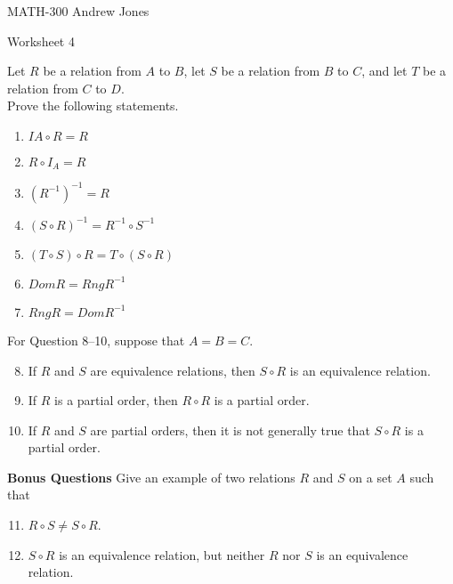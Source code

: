 \documentclass{article}
\begin{document}
    MATH-300 \hfill Andrew Jones
  \begin{center}
  {\huge Worksheet 4}
  \end{center}
  Let $R$ be a relation from $A$ to $B$, let $S$ be a relation from $B$ to $C$, and let $T$ be a relation from $C$ to $D$. \\ Prove the following statements. \\
  \begin{enumerate}
    \item $IA \circ R = R$
    \item $R \circ I_A = R$
    \item $(R^{-1})^{-1} = R$
    \item $(S \circ R)^{-1} = R^{-1}\circ S^{-1}$
    \item $(T \circ S) \circ R = T \circ (S \circ R)$
    \item $Dom R = Rng R^{-1}$
    \item $Rng R = Dom R^{-1}$
  \end{enumerate}
  For Question 8–10, suppose that $A = B = C$.
  \begin{enumerate} \setcounter{enumi}{7}
    \item If $R$ and $S$ are equivalence relations, then $S \circ R$ is an equivalence relation.
    \item If $R$ is a partial order, then $R \circ R$ is a partial order.
    \item If $R$ and $S$ are partial orders, then it is not generally true that $S \circ R$ is a partial order.
  \end{enumerate}
  \textbf{Bonus Questions}
  Give an example of two relations $R$ and $S$ on a set $A$ such that \\
  \begin{enumerate} \setcounter{enumi}{10}
    \item $R \circ S \neq S \circ R$.
    \item $S \circ R$ is an equivalence relation, but neither $R$ nor $S$ is an equivalence relation.
   \end{enumerate}
\end{document}
